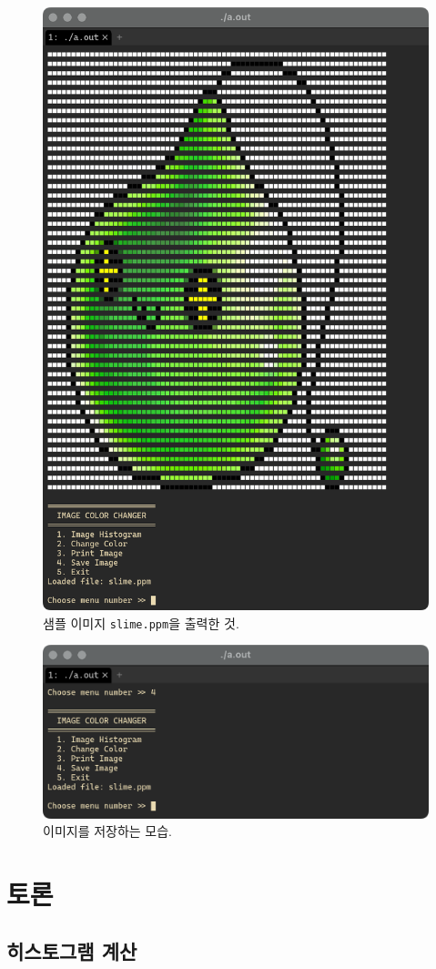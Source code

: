 \documentclass[titlepage]{article}
\begin{document}
\begin{figure}[H]
  \centering
  \includegraphics[width=0.7\linewidth]{print_image.png}
  \caption{샘플 이미지 \texttt{slime.ppm}을 출력한 것.}
\end{figure}

\begin{figure}[H]
  \centering
  \includegraphics[width=0.7\linewidth]{save_image.png}
  \caption{이미지를 저장하는 모습.}
\end{figure}

\section{토론}

\subsection{히스토그램 계산}
\end{document}
